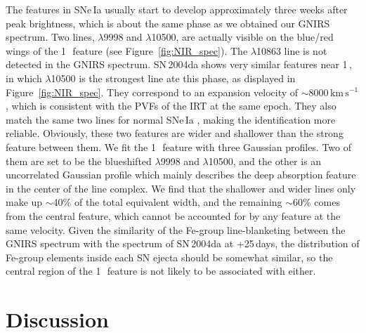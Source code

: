 \documentclass[twocolumn]{aastex631}
\newcommand{\kms}{$\mathrm{km}\,\mathrm{s}^{-1}$}
\begin{document}
The  features in SNe\,Ia usually start to develop approximately three weeks after peak brightness, which is about the same phase as we obtained our GNIRS spectrum. Two  lines, $\lambda$9998 and $\lambda$10500, are actually visible on the blue/red wings of the 1\,\micron\ feature (see Figure~\ref{fig:NIR_spec}). The  $\lambda$10863 line is not detected in the GNIRS spectrum. SN\,2004da shows very similar  features near 1\,\micron, in which  $\lambda$10500 is the strongest line ate this phase, as displayed in Figure~\ref{fig:NIR_spec}. They correspond to an expansion velocity of $\sim$8000\,\kms, which is consistent with the PVFs of the  IRT at the same epoch. They also match the same two lines for normal SNe\,Ia \citep{Marion2009_NIR}, making the identification more reliable. Obviously, these two  features are wider and shallower than the strong feature between them. We fit the 1\,\micron\ feature with three Gaussian profiles. Two of them are set to be the blueshifted  $\lambda$9998 and $\lambda$10500, and the other is an uncorrelated Gaussian profile which mainly describes the deep absorption feature in the center of the line complex. We find that the shallower and wider  lines only make up $\sim$40\% of the total equivalent width, and the remaining $\sim$60\% comes from the central feature, which cannot be accounted for by any  feature at the same velocity. Given the similarity of the Fe-group line-blanketing between the GNIRS spectrum with the spectrum of SN\,2004da at +25\,days, the distribution of Fe-group elements inside each SN ejecta should be somewhat similar, so the central region of the 1\,\micron\ feature is not likely to be associated with  either.

\section{Discussion} \label{sec:discussion}
\end{document}
